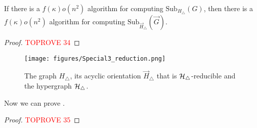 \documentclass[a4paper,UKenglish,cleveref, autoref, numberwithinsect, thm-restate]{lipics-v2021}
\newcommand{\reducible}[1]{${#1}$-reducible}
\newcommand{\hyperthree}{\cH_\triangle}
\newcommand{\Sub}[2]{\mathrm{Sub}_{#2}(#1)}
\newcommand{\degen}{\kappa}
\newcommand{\cH}{{\cal H}}
\begin{document}
	\begin{lemma} \label{lem:aux_conj}
		If there is a $f(\degen)o(n^2)$ algorithm for computing $\Sub{G}{H_\triangle}$, then there is a $f(\degen)o(n^2)$ algorithm for computing $\Sub{\vec{G}}{\vec{H}_\triangle}$.
	\end{lemma}
	\begin{proof}\textcolor{red}{TOPROVE 34}\end{proof}
	\begin{figure}
	\centering
	\texttt{[image: figures/Special3\_reduction.png]}\caption{The graph $H_\triangle$, its acyclic orientation $\vec{H}_\triangle$ that is \reducible{\hyperthree} and the hypergraph $\hyperthree$.}
	\label{fig:reduction_three}
	\end{figure}
		
	Now we can prove .
	\hardness*
	\begin{proof}\textcolor{red}{TOPROVE 35}\end{proof}
	

	
\end{document}
